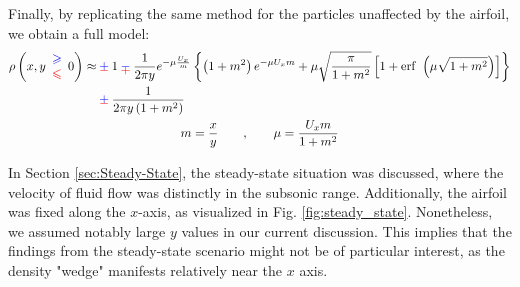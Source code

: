 Finally, by replicating the same method for the particles unaffected by the airfoil, we obtain a full model:
\begin{gather}
\begin{aligned}
\rho\left(
x,y\begin{array}{ c }
\textcolor[rgb]{0,0,1}{\geqslant }\\
\textcolor[rgb]{1,0,0}{\leqslant }
\end{array} 0
\right)\approx
&  \cpm 1 \cmp\frac{1}{2\pi y} e^{-\mu \frac{U_{x}}{m}}\left\{\left( 1+m^{2}\right) e^{-\mu U_{x} m} + \mu \sqrt{\frac{\pi }{1+m^{2}}}\left[ 1+\mathrm{erf} \ \left( \mu \sqrt{1+m^{2}}\right)\right]\right\}\\
 & \cpm\frac{1}{2\pi y\left( 1+m^{2}\right)}
\end{aligned} \\
m=\frac{x}{y} \quad \quad ,\quad \quad \mu =\frac{U_{x} m}{1+m^2}
\nonumber
\end{gather}

In Section \ref{sec:Steady-State}, the steady-state situation was discussed, where the velocity of fluid flow was distinctly in the subsonic range. Additionally, the airfoil was fixed along the $x$-axis, as visualized in Fig. \ref{fig:steady_state}. Nonetheless, we assumed notably large $y$ values in our current discussion. This implies that the findings from the steady-state scenario might not be of particular interest, as the density "wedge" manifests relatively near the $x$ axis.

